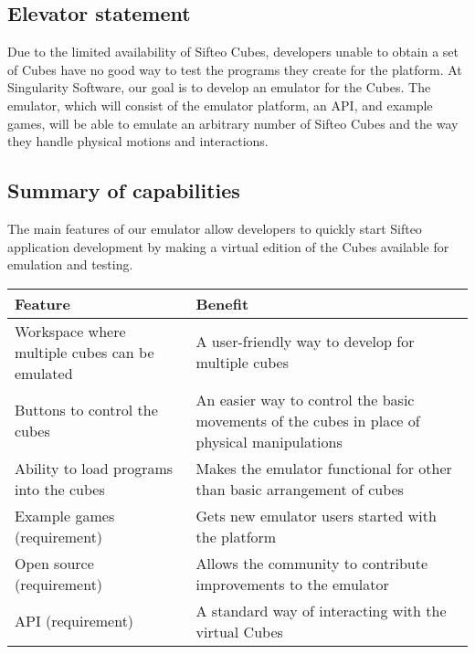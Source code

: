 \documentclass[12pt]{article}
\begin{document}
              \subsection{Elevator statement}
              Due to the limited availability of Sifteo Cubes, developers unable to obtain a set of Cubes have no good way to test the programs they create for the platform. At Singularity Software, our goal is to develop an emulator for the Cubes. The emulator, which will consist of the emulator platform, an API, and example games, will be able to emulate an arbitrary number of Sifteo Cubes and the way they handle physical motions and interactions.
\clearpage
              \subsection{Summary of capabilities}
              The main features of our emulator allow developers to quickly start Sifteo application development by making a virtual edition of the Cubes available for emulation and testing.
              \begin{table}[h]
                \begin{tabular}{p{3in} | p{3in}}
                  \textbf{Feature} & \textbf{Benefit} \\ \hline
                  Workspace where multiple cubes can be emulated
                            & A user-friendly way to develop for multiple cubes \\ \hline
                  Buttons to control the cubes
                            & An easier way to control the basic movements of the cubes in place of physical manipulations \\ \hline
                  Ability to load programs into the cubes
                            & Makes the emulator functional for other than basic arrangement of cubes \\ \hline
                  Example games (requirement)
                            & Gets new emulator users started with the platform \\ \hline
                  Open source  (requirement)
                            & Allows the community to contribute improvements to the emulator \\ \hline
                  API (requirement)
                            & A standard way of interacting with the virtual Cubes
                \end{tabular}
              \end{table}
\end{document}
